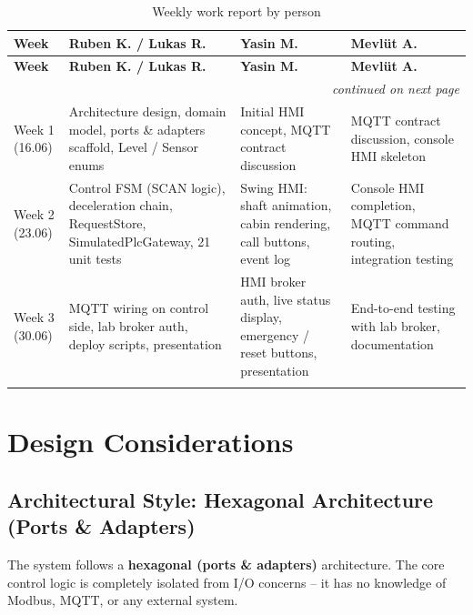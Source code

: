 \documentclass[12pt,a4paper]{article}
\begin{document}
\begin{longtable}{@{}lp{3.6cm}p{3.6cm}p{3.6cm}@{}}
\toprule
\textbf{Week} & \textbf{Ruben K. / Lukas R.} & \textbf{Yasin M.} & \textbf{Mevl\"{u}t A.} \\
\midrule
\endfirsthead
\toprule
\textbf{Week} & \textbf{Ruben K. / Lukas R.} & \textbf{Yasin M.} & \textbf{Mevl\"{u}t A.} \\
\midrule
\endhead
\midrule
\multicolumn{4}{r}{\small\itshape continued on next page} \\
\endfoot
\bottomrule
\endlastfoot

Week 1 \newline (16.06)
  & Architecture design, domain model, ports \& adapters scaffold, Level / Sensor enums
  & Initial HMI concept, MQTT contract discussion
  & MQTT contract discussion, console HMI skeleton \\[6pt]

Week 2 \newline (23.06)
  & Control FSM (SCAN logic), deceleration chain, RequestStore, SimulatedPlcGateway, 21 unit tests
  & Swing HMI: shaft animation, cabin rendering, call buttons, event log
  & Console HMI completion, MQTT command routing, integration testing \\[6pt]

Week 3 \newline (30.06)
  & MQTT wiring on control side, lab broker auth, deploy scripts, presentation
  & HMI broker auth, live status display, emergency / reset buttons, presentation
  & End-to-end testing with lab broker, documentation \\

\caption{Weekly work report by person}
\end{longtable}

\section{Design Considerations}

\subsection{Architectural Style: Hexagonal Architecture (Ports \& Adapters)}

The system follows a \textbf{hexagonal (ports \& adapters)} architecture.
The core control logic is completely isolated from I/O concerns -- it has no
knowledge of Modbus, MQTT, or any external system.
\end{document}
